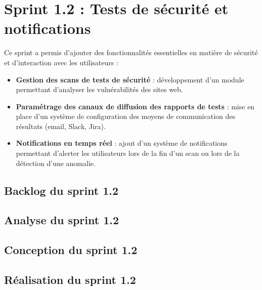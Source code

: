 \section{Sprint 1.2 : Tests de sécurité et notifications}
Ce sprint a permis d’ajouter des fonctionnalités essentielles en matière de sécurité et d’interaction avec les utilisateurs :
\begin{itemize}[label=$-$]
    \item \textbf{Gestion des scans de tests de sécurité} : développement d’un module permettant d’analyser les vulnérabilités des sites web.
    \item \textbf{Paramétrage des canaux de diffusion des rapports de tests} : mise en place d’un système de configuration des moyens de communication des résultats (email, Slack, Jira).
    \item \textbf{Notifications en temps réel} : ajout d’un système de notifications permettant d’alerter les utilisateurs lors de la fin d’un scan ou lors de la détection d’une anomalie.
\end{itemize}
\subsection{Backlog du sprint 1.2}  

\subsection{Analyse du sprint 1.2}

\subsection{Conception du sprint 1.2}

\subsection{Réalisation du sprint 1.2}



















